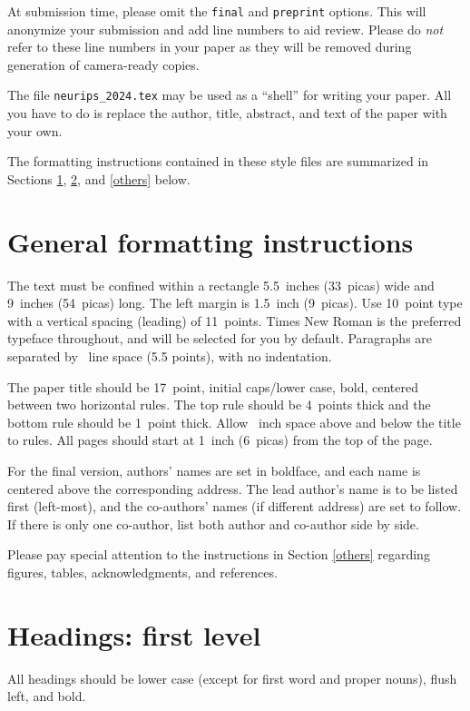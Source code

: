 \documentclass{article}
\begin{document}
At submission time, please omit the \verb+final+ and \verb+preprint+
options. This will anonymize your submission and add line numbers to aid
review. Please do \emph{not} refer to these line numbers in your paper as they
will be removed during generation of camera-ready copies.


The file \verb+neurips_2024.tex+ may be used as a ``shell'' for writing your
paper. All you have to do is replace the author, title, abstract, and text of
the paper with your own.


The formatting instructions contained in these style files are summarized in
Sections \ref{gen_inst}, \ref{headings}, and \ref{others} below.


\section{General formatting instructions}
\label{gen_inst}


The text must be confined within a rectangle 5.5~inches (33~picas) wide and
9~inches (54~picas) long. The left margin is 1.5~inch (9~picas).  Use 10~point
type with a vertical spacing (leading) of 11~points.  Times New Roman is the
preferred typeface throughout, and will be selected for you by default.
Paragraphs are separated by ~line space (5.5 points), with no
indentation.


The paper title should be 17~point, initial caps/lower case, bold, centered
between two horizontal rules. The top rule should be 4~points thick and the
bottom rule should be 1~point thick. Allow ~inch space above and
below the title to rules. All pages should start at 1~inch (6~picas) from the
top of the page.


For the final version, authors' names are set in boldface, and each name is
centered above the corresponding address. The lead author's name is to be listed
first (left-most), and the co-authors' names (if different address) are set to
follow. If there is only one co-author, list both author and co-author side by
side.


Please pay special attention to the instructions in Section \ref{others}
regarding figures, tables, acknowledgments, and references.


\section{Headings: first level}
\label{headings}


All headings should be lower case (except for first word and proper nouns),
flush left, and bold.
\end{document}

